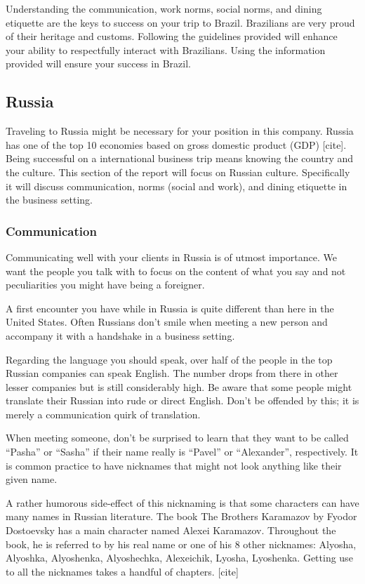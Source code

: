 \documentclass[11pt,a4paper,oneside]{report}
\begin{document}
Understanding the communication, work norms, social norms, and dining etiquette
are the keys to success on your trip to Brazil. Brazilians are very proud of
their heritage and customs. Following the guidelines provided will enhance your
ability to respectfully interact with Brazilians. Using the information
provided will ensure your success in Brazil.

\subsection{Russia}\label{second}

Traveling to Russia might be necessary for your position in this company.
Russia has one of the top 10 economies based on gross domestic product (GDP)
[cite]. Being successful on a international business trip means knowing the
country and the culture. This section of the report will focus on Russian
culture. Specifically it will discuss communication, norms (social and work),
and dining etiquette in the business setting.

\subsubsection{Communication}\label{third}

Communicating well with your clients in Russia is of utmost importance. We want
the people you talk with to focus on the content of what you say and not
peculiarities you might have being a foreigner.

A first encounter you have while in Russia is quite different than here in the
United States. Often Russians don’t smile when meeting a new person and
accompany it with a handshake in a business setting.

Regarding the language you should speak, over half of the people in the top
Russian companies can speak English. The number drops from there in other
lesser companies but is still considerably high. Be aware that some people
might translate their Russian into rude or direct English. Don’t be offended by
this; it is merely a communication quirk of translation.

When meeting someone, don’t be surprised to learn that they want to be called
“Pasha” or “Sasha” if their name really is “Pavel” or “Alexander”,
respectively. It is common practice to have nicknames that might not look
anything like their given name.

A rather humorous side-effect of this nicknaming is that some characters can
have many names in Russian literature. The book The Brothers Karamazov by
Fyodor Dostoevsky has a main character named Alexei Karamazov. Throughout the
book, he is referred to by his real name or one of his 8 other nicknames:
Alyosha, Alyoshka, Alyoshenka, Alyoshechka, Alexeichik, Lyosha, Lyoshenka.
Getting use to all the nicknames takes a handful of chapters. [cite]
\end{document}
